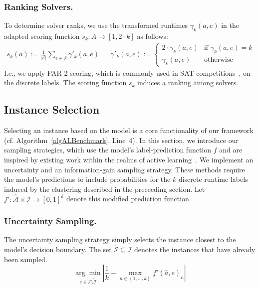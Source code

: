 \documentclass[runningheads]{llncs}
\begin{document}
\subsubsection{Ranking Solvers.}

To determine solver ranks, we use the transformed runtimes $\gamma_k(a, e)$ in the adapted scoring function $s_k : A \rightarrow [1, 2 \cdot k]$ as follows:
%
\begin{align}
  s_k(a) := \frac{1}{|\mathcal{I}|} \sum_{e \in \mathcal{I}} \gamma'_k(a, e)
  &&
  \gamma'_k(a, e) := \begin{cases}
    2 \cdot \gamma_k(a, e)   & \text{if } \gamma_k(a, e) = k\\
  \gamma_k(a, e)  & \text{otherwise}
  \end{cases}
  \label{eq:rankingeq}
\end{align}
%
I.e., we apply PAR-2 scoring, which is commonly used in SAT competitions~\cite{FroleyksHIJS21}, on the discrete labels.
The scoring function $s_k$ induces a ranking among solvers.


\subsection{Instance Selection}
\label{sec:main:selection}

Selecting an instance based on the model is a core functionality of our framework (cf. Algorithm~\ref{algALBenchmark}, Line~4).
In this section, we introduce our sampling strategies, which use the model's label-prediction function $f$ and are inspired by existing work within the realms of active learning~\cite{settles2009active}.
We implement an uncertainty and an information-gain sampling strategy.
These methods require the model's predictions to include probabilities for the $k$ discrete runtime labels induced by the clustering described in the preceeding section.
Let \mbox{$f' : \mathcal{\hat A} \times \mathcal{I} \rightarrow \left[0, 1\right]^k$} denote this modified prediction function.

\subsubsection{Uncertainty Sampling.}

The uncertainty sampling strategy simply selects the instance closest to the model's decision boundary.
The set $\tilde{\mathcal{I}} \subseteq \mathcal{I}$ denotes the instances that have already been sampled.
%
\begin{equation*}
  \underset{e \in \mathcal{I} \setminus \tilde{\mathcal{I}}}{\arg\min} \left\lvert \frac{1}{k} - \max_{n \in \left\lbrace 1, \dots, k \right\rbrace} f'\!\left(\hat{a}, e\right)_{n} \right\rvert
\end{equation*}
\end{document}
